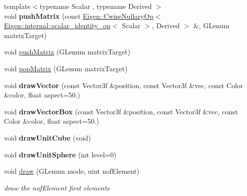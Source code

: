 \begin{DoxyCompactItemize}
\item 
\mbox{\label{class_gpu_helper_a73feb2db6afad42ecac360a6c6a4e84f}} 
{\footnotesize template$<$typename Scalar , typename Derived $>$ }\\void {\bfseries push\+Matrix} (const \hyperlink{group___core___module_class_eigen_1_1_cwise_nullary_op}{Eigen\+::\+Cwise\+Nullary\+Op}$<$ \hyperlink{struct_eigen_1_1internal_1_1scalar__identity__op}{Eigen\+::internal\+::scalar\+\_\+identity\+\_\+op}$<$ Scalar $>$, Derived $>$ \&, G\+Lenum matrix\+Target)
\item 
void \hyperlink{class_gpu_helper_a515a9248689ca95d90a1919b2e6973ec}{push\+Matrix} (G\+Lenum matrix\+Target)
\item 
void \hyperlink{class_gpu_helper_aad0cc23c2eaf0dcc610b180e5c8b195e}{pop\+Matrix} (G\+Lenum matrix\+Target)
\item 
\mbox{\label{class_gpu_helper_a0d2c77ee60d1954d609af0ca1075fb06}} 
void {\bfseries draw\+Vector} (const Vector3f \&position, const Vector3f \&vec, const Color \&color, float aspect=50.)
\item 
\mbox{\label{class_gpu_helper_a31bf94099a0d4d70bdc86a881f5661ed}} 
void {\bfseries draw\+Vector\+Box} (const Vector3f \&position, const Vector3f \&vec, const Color \&color, float aspect=50.)
\item 
\mbox{\label{class_gpu_helper_a56e1a7dc525c50f0aef95860bccde68b}} 
void {\bfseries draw\+Unit\+Cube} (void)
\item 
\mbox{\label{class_gpu_helper_a11c4e7fce24ba5ec6fb22d94f5a340ee}} 
void {\bfseries draw\+Unit\+Sphere} (int level=0)
\item 
\mbox{\label{class_gpu_helper_a154eb0bf7bf7c764dccb874ce38af766}} 
void \hyperlink{class_gpu_helper_a154eb0bf7bf7c764dccb874ce38af766}{draw} (G\+Lenum mode, uint nof\+Element)
\begin{DoxyCompactList}\small\item\em draw the {\itshape nof\+Element} first elements \end{DoxyCompactList}\item 
\mbox{\label{class_gpu_helper_a4450191786c5b0533d4bc291d2b6ce19}} 

\end{DoxyCompactItemize}
